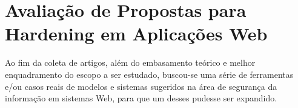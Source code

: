 




\section{Avaliação de Propostas para Hardening em Aplicações Web}
Ao fim da coleta de artigos, além do embasamento teórico e melhor enquadramento do escopo a ser estudado, buscou-se uma série de ferramentas e/ou casos reais de modelos e sistemas sugeridos na área de segurança da informação em sistemas Web, para que um desses pudesse ser expandido.

